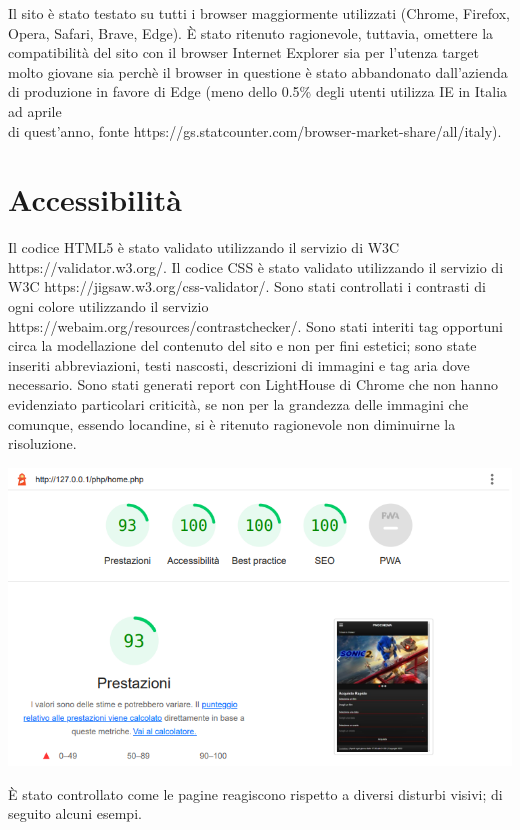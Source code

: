 \documentclass[a4paper, 12pt]{article}
\begin{document}
Il sito è stato testato su tutti i browser maggiormente utilizzati (Chrome, Firefox, Opera, Safari, Brave, Edge). È stato ritenuto ragionevole, tuttavia, omettere la compatibilità del sito con il browser Internet Explorer sia per l'utenza target molto giovane sia perchè il browser in questione è stato abbandonato dall'azienda di produzione in favore di Edge (meno dello 0.5\% degli utenti utilizza IE in Italia ad aprile \\di quest'anno, fonte https://gs.statcounter.com/browser-market-share/all/italy).
\newpage
\section{Accessibilità}
Il codice HTML5 è stato validato utilizzando il servizio di W3C https://validator.w3.org/.
Il codice CSS è stato validato utilizzando il servizio di W3C https://jigsaw.w3.org/css-validator/.
Sono stati controllati i contrasti di ogni colore utilizzando il servizio \\https://webaim.org/resources/contrastchecker/.
Sono stati interiti tag opportuni circa la modellazione del contenuto del sito e non per fini estetici; sono state inseriti abbreviazioni, testi nascosti, descrizioni di immagini e tag aria dove necessario.
Sono stati generati report con LightHouse di Chrome che non hanno evidenziato particolari criticità, se non per la grandezza delle immagini che comunque, essendo locandine, si è ritenuto ragionevole non
diminuirne la risoluzione.
\begin{center}
    \includegraphics[scale=0.4]{home}
\end{center}
È stato controllato come le pagine reagiscono rispetto a diversi disturbi visivi; di seguito alcuni esempi.
\end{document}
